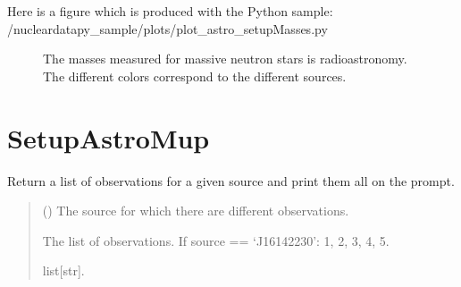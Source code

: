 \documentclass[letterpaper,10pt,english]{sphinxmanual}
\begin{document}
\sphinxAtStartPar
Here is a figure which is produced with the Python sample: /nucleardatapy\_sample/plots/plot\_astro\_setupMasses.py

\begin{figure}[htbp]
\centering
\capstart

\noindent{}
\caption{The masses measured for massive neutron stars is radio\sphinxhyphen{}astronomy. The different colors correspond to the different sources.}\label{\detokenize{source/api/setup_astro_masses:id1}}\end{figure}

\sphinxstepscope


\section{SetupAstroMup}
\label{\detokenize{source/api/setup_astro_mup:setupastromup}}\label{\detokenize{source/api/setup_astro_mup::doc}}\label{\detokenize{source/api/setup_astro_mup:module-nucleardatapy.astro.setup_mup}}

\begin{fulllineitems}
\label{\detokenize{source/api/setup_astro_mup:nucleardatapy.astro.setup_mup.mup_hyps}}
\pysigstartsignatures
{}
\pysigstopsignatures
\sphinxAtStartPar
Return a list of observations for a given source and print them all on the prompt.
\begin{quote}\begin{description}
\sphinxAtStartPar
{} () \textendash{} The source for which there are different observations.

\sphinxAtStartPar
The list of observations.     If source == ‘J1614\textendash{}2230’: 1, 2, 3, 4, 5.

\sphinxAtStartPar
list{[}str{]}.

\end{description}\end{quote}

\end{fulllineitems}
\end{document}
